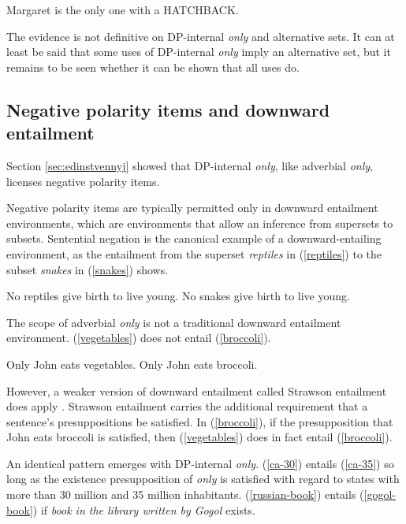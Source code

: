 \begin{exe}
	\ex \label{margaret-hatchback} Margaret is the only one with a HATCHBACK.
\end{exe}

The evidence is not definitive on DP-internal \textit{only} and alternative sets. It can at least be said that some uses of DP-internal \textit{only} imply an alternative set, but it remains to be seen whether it can be shown that all uses do.

\subsection{Negative polarity items and downward entailment}
Section \ref{sec:edinstvennyj} showed that DP-internal \textit{only}, like adverbial \textit{only}, licenses negative polarity items.

Negative polarity items are typically permitted only in downward entailment environments, which are environments that allow an inference from supersets to subsets. Sentential negation is the canonical example of a downward-entailing environment, as the entailment from the superset \textit{reptiles} in (\ref{reptiles}) to the subset \textit{snakes} in (\ref{snakes}) shows.

\begin{exe}
	\ex \label{reptiles} No reptiles give birth to live young.
	\ex \label{snakes} No snakes give birth to live young.
\end{exe}

The scope of adverbial \textit{only} is not a traditional downward entailment environment. (\ref{vegetables}) does not entail (\ref{broccoli}).

\begin{exe}
	\ex \label{vegetables} Only John eats vegetables.
	\ex \label{broccoli} Only John eats broccoli.
\end{exe}

However, a weaker version of downward entailment called Strawson entailment does apply \citep{fintel99}. Strawson entailment carries the additional requirement that a sentence's presuppositions be satisfied. In (\ref{broccoli}), if the presupposition that John eats broccoli is satisfied, then (\ref{vegetables}) does in fact entail (\ref{broccoli}).

An identical pattern emerges with DP-internal \textit{only}. (\ref{ca-30}) entails (\ref{ca-35}) so long as the existence presupposition of \textit{only} is satisfied with regard to states with more than 30 million and 35 million inhabitants. (\ref{russian-book}) entails (\ref{gogol-book}) if \textit{book in the library written by Gogol} exists.

